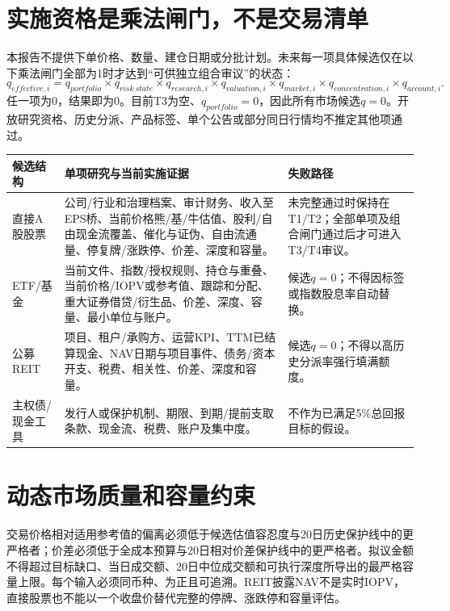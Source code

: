 \section{实施资格是乘法闸门，不是交易清单}

本报告不提供下单价格、数量、建仓日期或分批计划。未来每一项具体候选仅在以下乘法闸门全部为1时才达到“可供独立组合审议”的状态：
\[
q_{effective,i}=q_{portfolio}\times q_{risk\ state}\times q_{research,i}
\times q_{valuation,i}\times q_{market,i}\times q_{concentration,i}
\times q_{account,i}.
\]
任一项为0，结果即为0。目前T3为空、$q_{portfolio}=0$，因此所有市场候选$q=0$。开放研究资格、历史分派、产品标签、单个公告或部分同日行情均不推定其他项通过。

\begin{exhibitbox}[不同结构的候选必须补齐的当前数据包]
\small
\begin{tabularx}{\exhibitboxwidth}{L{2.65cm}P P}
\toprule
\textbf{候选结构} & \textbf{单项研究与当前实施证据} & \textbf{失败路径} \\
\midrule
直接A股股票 & 公司/行业和治理档案、审计财务、收入至EPS桥、当前价格熊/基/牛估值、股利/自由现金流覆盖、催化与证伪、自由流通量、停复牌/涨跌停、价差、深度和容量。 & 未完整通过时保持在T1/T2；全部单项及组合闸门通过后才可进入T3/T4审议。 \\
ETF/基金 & 当前文件、指数/授权规则、持仓与重叠、当前价格/IOPV或参考值、跟踪和分配、重大证券借贷/衍生品、价差、深度、容量、最小单位与账户。 & 候选$q=0$；不得因标签或指数股息率自动替换。 \\
公募REIT & 项目、租户/承购方、运营KPI、TTM已结算现金、NAV日期与项目事件、债务/资本开支、税费、相关性、价差、深度和容量。 & 候选$q=0$；不得以高历史分派率强行填满额度。 \\
主权债/现金工具 & 发行人或保护机制、期限、到期/提前支取条款、现金流、税费、账户及集中度。 & 不作为已满足5\%总回报目标的假设。 \\
\bottomrule
\end{tabularx}
\end{exhibitbox}

\section{动态市场质量和容量约束}

交易价格相对适用参考值的偏离必须低于候选估值容忍度与20日历史保护线中的更严格者；价差必须低于全成本预算与20日相对价差保护线中的更严格者。拟议金额不得超过目标缺口、当日成交额、20日中位成交额和可执行深度所导出的最严格容量上限。每个输入必须同币种、为正且可追溯。REIT披露NAV不是实时IOPV，直接股票也不能以一个收盘价替代完整的停牌、涨跌停和容量评估。

